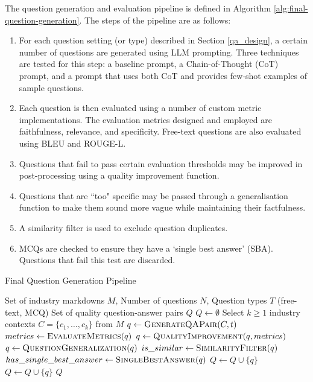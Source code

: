 The question generation and evaluation pipeline is defined in Algorithm \ref{alg:final-question-generation}. The steps of the pipeline are as follows:
\begin{enumerate}
    \item For each question setting (or type) described in Section \ref{qa_design}, a certain number of questions are generated using LLM prompting. Three techniques are tested for this step: a baseline prompt, a Chain-of-Thought (CoT) prompt, and a prompt that uses both CoT and provides few-shot examples of sample questions.
    \item Each question is then evaluated using a number of custom metric implementations. The evaluation metrics designed and employed are faithfulness, relevance, and specificity. Free-text questions are also evaluated using BLEU and ROUGE-L.
    \item Questions that fail to pass certain evaluation thresholds may be improved in post-processing using a quality improvement function.
    \item Questions that are ``too" specific may be passed through a generalisation function to make them sound more vague while maintaining their factfulness.
    \item A similarity filter is used to exclude question duplicates.
    \item MCQs are checked to ensure they have a `single best answer' (SBA). Questions that fail this test are discarded.
\end{enumerate}
\begin{algorithm}[H]
\caption{Final Question Generation Pipeline}
\label{alg:final-question-generation}
\begin{algorithmic}[1]
\Require Set of industry markdowns $M$, Number of questions $N$, Question types $T$ (free-text, MCQ)
\Ensure Set of quality question-answer pairs $Q$
\State $Q \gets \emptyset$
        \State Select $k \geq 1$ industry contexts $C = \{c_1, \ldots, c_k\}$ from $M$
        \State $q \gets \Call{GenerateQAPair}{C, t}$ 
        \State $metrics \gets \Call{EvaluateMetrics}{q}$
         
            \State $q \gets \Call{QualityImprovement}{q, metrics}$
        \EndIf
            \State $q \gets \Call{QuestionGeneralization}{q}$
        \EndIf
        \State $is\_similar \gets \Call{SimilarityFilter}{q}$
                \State $has\_single\_best\_answer \gets \Call{SingleBestAnswer}{q}$
                    \State $Q \gets Q \cup \{q\}$
                \EndIf
            \Else
                \State $Q \gets Q \cup \{q\}$
            \EndIf
        \EndIf
    \EndFor
\EndFor
\State \Return $Q$
\end{algorithmic}
\end{algorithm}
